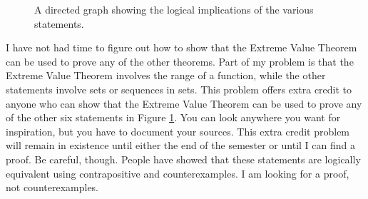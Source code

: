 \documentclass[10pt]{article}
\theoremstyle{definition}
\begin{document}
\begin{enumerate}
\begin{figure}[h]
\begin{center}
	\caption{A directed graph showing the logical implications of the various statements.}\label{fig:theorems}
	\end{center}
	\end{figure}
	
	
I have not had time to figure out how to show that the Extreme Value Theorem can be used to prove any of the other theorems.  Part of my problem is that the Extreme Value Theorem involves the range of a function, while the other statements involve sets or sequences in sets.  This problem offers extra credit to anyone who can show that the Extreme Value Theorem can be used to prove any of the other six statements in Figure \ref{fig:theorems}.  You can look anywhere you want for inspiration, but you have to document your sources.  This extra credit problem will remain in existence until either the end of the semester or until I can find a proof.  Be careful, though.  People have showed that these statements are logically equivalent using contrapositive and counterexamples.  I am looking for a proof, not counterexamples.
	

\end{enumerate}
\end{document}
